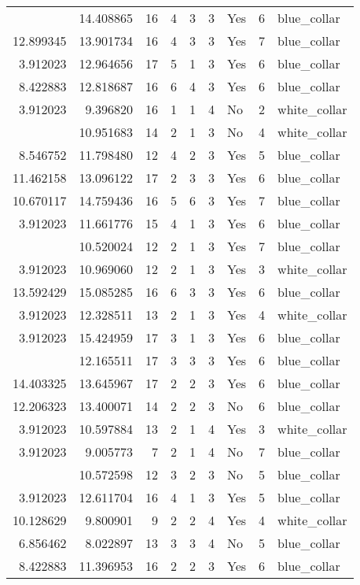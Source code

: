 \documentclass[
]{article}
\begin{document}
\begin{longtable}[t]{rrrrrllrl}
\addlinespace
12.181011 & 14.408865 & 16 & 4 & 3 & 3 & Yes & 6 & blue\_collar\\
12.899345 & 13.901734 & 16 & 4 & 3 & 3 & Yes & 7 & blue\_collar\\
3.912023 & 12.964656 & 17 & 5 & 1 & 3 & Yes & 6 & blue\_collar\\
8.422883 & 12.818687 & 16 & 6 & 4 & 3 & Yes & 6 & blue\_collar\\
3.912023 & 9.396820 & 16 & 1 & 1 & 4 & No & 2 & white\_collar\\
\addlinespace
3.912023 & 10.951683 & 14 & 2 & 1 & 3 & No & 4 & white\_collar\\
8.546752 & 11.798480 & 12 & 4 & 2 & 3 & Yes & 5 & blue\_collar\\
11.462158 & 13.096122 & 17 & 2 & 3 & 3 & Yes & 6 & blue\_collar\\
10.670117 & 14.759436 & 16 & 5 & 6 & 3 & Yes & 7 & blue\_collar\\
3.912023 & 11.661776 & 15 & 4 & 1 & 3 & Yes & 6 & blue\_collar\\
\addlinespace
3.912023 & 10.520024 & 12 & 2 & 1 & 3 & Yes & 7 & blue\_collar\\
3.912023 & 10.969060 & 12 & 2 & 1 & 3 & Yes & 3 & white\_collar\\
13.592429 & 15.085285 & 16 & 6 & 3 & 3 & Yes & 6 & blue\_collar\\
3.912023 & 12.328511 & 13 & 2 & 1 & 3 & Yes & 4 & white\_collar\\
3.912023 & 15.424959 & 17 & 3 & 1 & 3 & Yes & 6 & blue\_collar\\
\addlinespace
9.905984 & 12.165511 & 17 & 3 & 3 & 3 & Yes & 6 & blue\_collar\\
14.403325 & 13.645967 & 17 & 2 & 2 & 3 & Yes & 6 & blue\_collar\\
12.206323 & 13.400071 & 14 & 2 & 2 & 3 & No & 6 & blue\_collar\\
3.912023 & 10.597884 & 13 & 2 & 1 & 4 & Yes & 3 & white\_collar\\
3.912023 & 9.005773 & 7 & 2 & 1 & 4 & No & 7 & blue\_collar\\
\addlinespace
9.053687 & 10.572598 & 12 & 3 & 2 & 3 & No & 5 & blue\_collar\\
3.912023 & 12.611704 & 16 & 4 & 1 & 3 & Yes & 5 & blue\_collar\\
10.128629 & 9.800901 & 9 & 2 & 2 & 4 & Yes & 4 & white\_collar\\
6.856462 & 8.022897 & 13 & 3 & 3 & 4 & No & 5 & blue\_collar\\
8.422883 & 11.396953 & 16 & 2 & 2 & 3 & Yes & 6 & blue\_collar\\

\end{longtable}
\end{document}
